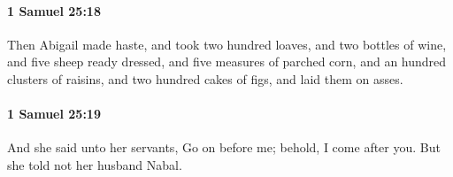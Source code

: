 		\paragraph{1 Samuel 25:18} %
			\label{1SAMUEL-25-18}

			Then Abigail made haste, and took two hundred loaves, and two bottles of wine, and five sheep ready dressed, and five measures of parched corn, and an hundred clusters of raisins, and two hundred cakes of figs, and laid them on asses.


		\paragraph{1 Samuel 25:19} %
			\label{1SAMUEL-25-19}

			And she said unto her servants, Go on before me; behold, I come after you. But she told not her husband Nabal.



